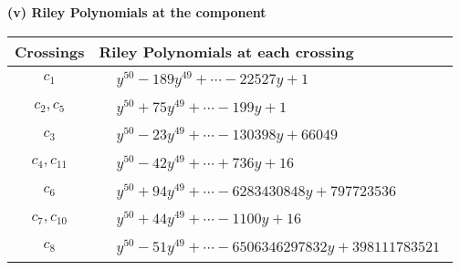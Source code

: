 \documentclass[1p]{elsarticle_modified}
\theoremstyle{definition}
\begin{document}
\newpage\renewcommand{\arraystretch}{1}
\flushleft \textbf{(v) Riley Polynomials at the component}\newline \\
\begin{tabular}{m{50pt}|m{274pt}}
Crossings & \hspace{64pt}Riley Polynomials at each crossing \\
\hline $$\begin{aligned}c_{1}\end{aligned}$$&$\begin{aligned}
&y^{50}-189 y^{49}+\cdots-22527 y+1
\end{aligned}$\\
\hline $$\begin{aligned}c_{2},c_{5}\end{aligned}$$&$\begin{aligned}
&y^{50}+75 y^{49}+\cdots-199 y+1
\end{aligned}$\\
\hline $$\begin{aligned}c_{3}\end{aligned}$$&$\begin{aligned}
&y^{50}-23 y^{49}+\cdots-130398 y+66049
\end{aligned}$\\
\hline $$\begin{aligned}c_{4},c_{11}\end{aligned}$$&$\begin{aligned}
&y^{50}-42 y^{49}+\cdots+736 y+16
\end{aligned}$\\
\hline $$\begin{aligned}c_{6}\end{aligned}$$&$\begin{aligned}
&y^{50}+94 y^{49}+\cdots-6283430848 y+797723536
\end{aligned}$\\
\hline $$\begin{aligned}c_{7},c_{10}\end{aligned}$$&$\begin{aligned}
&y^{50}+44 y^{49}+\cdots-1100 y+16
\end{aligned}$\\
\hline $$\begin{aligned}c_{8}\end{aligned}$$&$\begin{aligned}
&y^{50}-51 y^{49}+\cdots-6506346297832 y+398111783521
\end{aligned}$\\

\end{tabular}
\end{document}
